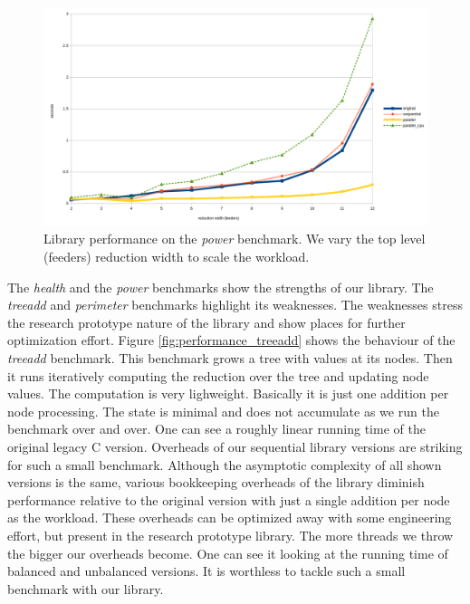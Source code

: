 \begin{figure}[!htb]
\includegraphics[width=1.0\textwidth]{images/power_reduction_width.png}
\caption{Library performance on the \textit{power} benchmark. We vary the top level (feeders) reduction width to scale the workload.}
\label{fig:performance_power_reduction_width}
\end{figure}\newline\null
\quad The \textit{health} and the \textit{power} benchmarks show the strengths of our library. The \textit{treeadd} and \textit{perimeter} benchmarks highlight its weaknesses. The weaknesses stress the research prototype nature of the library and show places for further optimization effort. Figure \ref{fig:performance_treeadd} shows the behaviour of the \textit{treeadd} benchmark. This benchmark grows a tree with values at its nodes. Then it runs iteratively computing the reduction over the tree and updating node values. The computation is very lighweight. Basically it is just one addition per node processing. The state is minimal and does not accumulate as we run the benchmark over and over. One can see a roughly linear running time of the original legacy C version. Overheads of our sequential library versions are striking for such a small benchmark. Although the asymptotic complexity of all shown versions is the same, various bookkeeping overheads of the library diminish performance relative to the original version with just a single addition per node as the workload. These overheads can be optimized away with some engineering effort, but present in the research prototype library. The more threads we throw the bigger our overheads become. One can see it looking at the running time of balanced and unbalanced versions. It is worthless to tackle such a small benchmark with our library.      
